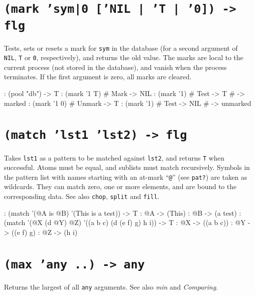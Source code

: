  
\section*{\texttt{(mark 'sym|0 ['NIL | 'T | '0]) -> flg}}
\label{sec:func-ref-M-(mark 'sym|0 ['NIL | 'T | '0]) -> flg}


Tests, sets or resets a mark for \texttt{sym} in the database (for a second
argument of \texttt{NIL}, \texttt{T} or \texttt{0}, respectively), and returns the old value.
The marks are local to the current process (not stored in the database),
and vanish when the process terminates. If the first argument is zero,
all marks are cleared.


\begin{wideverbatim}
: (pool "db")
-> T
: (mark '{1} T)      # Mark
-> NIL
: (mark '{1})        # Test
-> T                 # -> marked
: (mark '{1} 0)      # Unmark
-> T
: (mark '{1})        # Test
-> NIL               # -> unmarked
\end{wideverbatim}

 
\section*{\texttt{(match 'lst1 'lst2) -> flg}}
\label{sec:func-ref-M-(match 'lst1 'lst2) -> flg}


Takes \texttt{lst1} as a pattern to be matched against \texttt{lst2}, and returns \texttt{T}
when successful. Atoms must be equal, and sublists must match
recursively. Symbols in the pattern list with names starting with an
at-mark ``\texttt{@}'' (see \texttt{pat?}) are taken as wildcards. They can match zero,
one or more elements, and are bound to the corresponding data. See also
\texttt{chop}, \texttt{split} and \texttt{fill}.


\begin{wideverbatim}
: (match '(@A is @B) '(This is a test))
-> T
: @A
-> (This)
: @B
-> (a test)
: (match '(@X (d @Y) @Z) '((a b c) (d (e f) g) h i))
-> T
: @X
-> ((a b c))
: @Y
-> ((e f) g)
: @Z
-> (h i)
\end{wideverbatim}

 
\section*{\texttt{(max 'any ..) -> any}}
\label{sec:func-ref-M-(max 'any ..) -> any}


Returns the largest of all \texttt{any} arguments. See also
\emph{min} and \emph{Comparing}.


